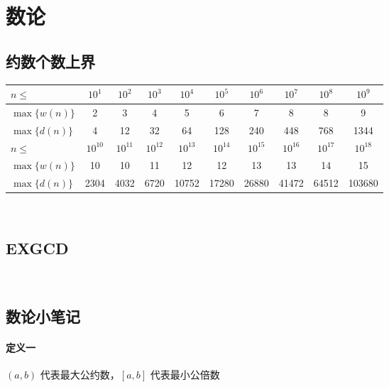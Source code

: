 %
%
	\newpage
	\section{数论}
	\subsection{约数个数上界}
	\begin{center}
		\renewcommand\arraystretch{1.5}
		\begin{tabular}{|l|c|c|c|c|c|c|c|c|c|}
			\hline
			$n\le$ & $10^1$ & $10^2$ & $10^3$& $10^4$& $10^5$& $10^6$& $10^7$ & $10^8$& $10^9$\\
			\hline
			$\max\{w(n)\}$&2&3&4&5&6&7&8&8&9\\
			\hline
			$\max\{d(n)\}$&4&12&32&64&128&240&448&768&1344\\
			\hline
			\hline
			$n\le$ &$10^{10}$& $10^{11}$ & $10^{12}$ & $10^{13}$& $10^{14}$& $10^{15}$& $10^{16}$& $10^{17}$ & $10^{18}$\\
			\hline
			$\max\{w(n)\}$&10&10&11&12&12&13&13&14&15\\
			\hline
			$\max\{d(n)\}$&2304&4032&6720&10752&17280&26880&41472&64512&103680\\
			\hline
		\end{tabular}
	\end{center}
	~\\
	\subsection{EXGCD}
	
	~\\
	\newpage
	
	\subsection{数论小笔记}
	\paragraph{定义一}$(a,b)$ 代表最大公约数，$[a,b]$ 代表最小公倍数

